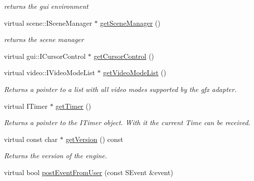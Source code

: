 \begin{DoxyCompactItemize}
\begin{DoxyCompactList}\small\item\em returns the gui environment \end{DoxyCompactList}\item 
\hypertarget{classirr_1_1_c_irr_device_stub_a261666e0d3fbd0fd8bdbed07fd1f45e3}{virtual scene\-::\-I\-Scene\-Manager $\ast$ \hyperlink{classirr_1_1_c_irr_device_stub_a261666e0d3fbd0fd8bdbed07fd1f45e3}{get\-Scene\-Manager} ()}\label{classirr_1_1_c_irr_device_stub_a261666e0d3fbd0fd8bdbed07fd1f45e3}

\begin{DoxyCompactList}\small\item\em returns the scene manager \end{DoxyCompactList}\item 
virtual gui\-::\-I\-Cursor\-Control $\ast$ \hyperlink{classirr_1_1_c_irr_device_stub_adcd0a494df8c5a70d4107125f4b106ba}{get\-Cursor\-Control} ()
\item 
virtual video\-::\-I\-Video\-Mode\-List $\ast$ \hyperlink{classirr_1_1_c_irr_device_stub_a5a1c5da64f0e470cf901c6f1e173dbc0}{get\-Video\-Mode\-List} ()
\begin{DoxyCompactList}\small\item\em Returns a pointer to a list with all video modes supported by the gfx adapter. \end{DoxyCompactList}\item 
virtual I\-Timer $\ast$ \hyperlink{classirr_1_1_c_irr_device_stub_a1ecf45ca1e7c4399ccee44b8871f7160}{get\-Timer} ()
\begin{DoxyCompactList}\small\item\em Returns a pointer to the I\-Timer object. With it the current Time can be received. \end{DoxyCompactList}\item 
\hypertarget{classirr_1_1_c_irr_device_stub_a91d3dab22822457dc989306b7268b165}{virtual const char $\ast$ \hyperlink{classirr_1_1_c_irr_device_stub_a91d3dab22822457dc989306b7268b165}{get\-Version} () const }\label{classirr_1_1_c_irr_device_stub_a91d3dab22822457dc989306b7268b165}

\begin{DoxyCompactList}\small\item\em Returns the version of the engine. \end{DoxyCompactList}\item 
\hypertarget{classirr_1_1_c_irr_device_stub_a3608dfce6d04ddab28927350f0f8b204}{virtual bool \hyperlink{classirr_1_1_c_irr_device_stub_a3608dfce6d04ddab28927350f0f8b204}{post\-Event\-From\-User} (const S\-Event \&event)}\label{classirr_1_1_c_irr_device_stub_a3608dfce6d04ddab28927350f0f8b204}


\end{DoxyCompactItemize}
